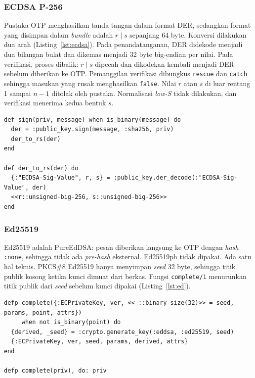 \subsubsection*{ECDSA P-256}
Pustaka OTP menghasilkan tanda tangan dalam format DER, sedangkan format yang disimpan dalam
\textit{bundle} adalah $r \mid s$ sepanjang 64 byte. Konversi dilakukan dua arah
(Listing~\ref{lst:ecdsa}). Pada penandatanganan, DER didekode menjadi dua bilangan bulat dan
dikemas menjadi 32 byte big-endian per nilai. Pada verifikasi, proses dibalik: $r \mid s$ dipecah
dan dikodekan kembali menjadi DER sebelum diberikan ke OTP. Pemanggilan verifikasi dibungkus
\texttt{rescue} dan \texttt{catch} sehingga masukan yang rusak menghasilkan \texttt{false}. Nilai
$r$ atau $s$ di luar rentang 1 sampai $n-1$ ditolak oleh pustaka. Normalisasi \textit{low-S} tidak
dilakukan, dan verifikasi menerima kedua bentuk $s$.

\begin{lstlisting}[basicstyle=\ttfamily\footnotesize,caption={Penandatanganan ECDSA P-256 dan konversi DER ke $r \mid s$},label={lst:ecdsa},numbers=none]
def sign(priv, message) when is_binary(message) do
  der = :public_key.sign(message, :sha256, priv)
  der_to_rs(der)
end

def der_to_rs(der) do
  {:"ECDSA-Sig-Value", r, s} = :public_key.der_decode(:"ECDSA-Sig-Value", der)
  <<r::unsigned-big-256, s::unsigned-big-256>>
end
\end{lstlisting}

\subsubsection*{Ed25519}
Ed25519 adalah PureEdDSA: pesan diberikan langsung ke OTP dengan \textit{hash} \texttt{:none},
sehingga tidak ada \textit{pre-hash} eksternal. Ed25519ph tidak dipakai. Ada satu hal teknis. PKCS\#8
Ed25519 hanya menyimpan \textit{seed} 32 byte, sehingga titik publik kosong ketika kunci dimuat
dari berkas. Fungsi \texttt{complete/1} menurunkan titik publik dari \textit{seed} sebelum kunci
dipakai (Listing~\ref{lst:ed}).

\begin{lstlisting}[basicstyle=\ttfamily\footnotesize,caption={Melengkapi titik publik Ed25519 dari \textit{seed}},label={lst:ed},numbers=none]
defp complete({:ECPrivateKey, ver, <<_::binary-size(32)>> = seed, params, point, attrs})
     when not is_binary(point) do
  {derived, _seed} = :crypto.generate_key(:eddsa, :ed25519, seed)
  {:ECPrivateKey, ver, seed, params, derived, attrs}
end

defp complete(priv), do: priv
\end{lstlisting}

